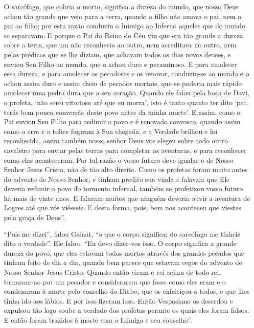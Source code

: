 O sarcófago, que cobria o morto, significa a dureza do mundo, que nosso Deus
achou tão grande que veio para a terra, quando o filho não amava o pai, nem o
pai ao filho; por esta razão conduziu o Inimigo ao Inferno aqueles que do mundo
se separavam. E porque o Pai do Reino do Céu viu que era tão grande a dureza
sobre a terra, que um não reconhecia ao outro, nem acreditava no outro, nem
pelas prédicas que se lhe diziam, que achavam todos os dias novos deuses, e
enviou Seu Filho ao mundo, que o achou duro e pecaminoso. E para amolecer essa
dureza, e para amolecer os pecadores e os renovar, conduziu-se ao mundo e o
achou assim duro e assim cheio de pecados mortais, que se poderia mais rápido
amolecer uma pedra dura que o seu coração. Quando ele falou pela boca de Davi,
o profeta, ‘não serei vitorioso até que eu morra’, isto é tanto quanto ter dito
‘pai, terás bem pouca conversão deste povo antes da minha morte’. E assim, como
o Pai enviou Seu Filho para redimir o povo e é renovado convosco, quando assim
como o erro e a tolice fugiram à Sua chegada, e a Verdade brilhou e foi
reconhecida, assim também nosso senhor Deus vos elegeu sobre todo outro
cavaleiro para enviar pelas terras para completar as aventuras, e para
reconhecer como elas aconteceram. Por tal razão o vosso futuro deve igualar o
de Nosso Senhor Jesus Cristo, não de tão alto direito. Como os profetas foram
muito antes do advento de Nosso Senhor, e tinham predito sua vinda e falavam
que Ele deveria redimir o povo do tormento infernal, também se profetizou vosso
futuro há mais de vinte anos. E falaram muitos que ninguém deveria ouvir a
aventura de Logres até que vós viésseis. E desta forma, pois, bem nos aconteceu
que viestes pela graça de Deus”.  

 “Pois me dizei”, falou Galaat, “o que o corpo significa; do sarcófago me
tínheis dito a verdade”. Ele falou: “Eu devo dizer-vos isso. O corpo significa
a grande dureza do povo, que eles estavam todos mortos através dos grandes
pecados que tinham feito de dia a dia, quando bem parece que estavam cegos do
advento de Nosso Senhor Jesus Cristo. Quando então viram o rei acima de todo
rei, tomaram-no por um pecador e consideraram que fosse como eles eram e o
condenaram à morte pelo conselho do Diabo, que os enfeitiçou a todos, e que
lhes tinha ido aos lábios. E por isso fizeram isso. Então Vespasiano os
deserdou e expulsou tão logo soube a verdade dos profetas perante os quais eles
foram falsos. E então foram trazidos à morte com o Inimigo e seu conselho”. 

